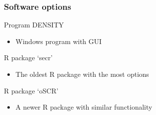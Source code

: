 \documentclass[color=usenames,dvipsnames]{beamer}\usepackage[]{graphicx}\usepackage[]{color}
\begin{document}
\begin{frame}
  \frametitle{Software options}
  Program DENSITY
  \begin{itemize}
    \item Windows program with GUI
  \end{itemize}
  \vfill
  R package `secr'
  \begin{itemize}
    \item The oldest R package with the most options
  \end{itemize}
  \vfill
  R package `oSCR'
  \begin{itemize}
    \item A newer R package with similar functionality
  \end{itemize}
\end{frame}






\end{document}
